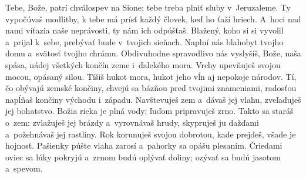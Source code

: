 Tebe, Bože, patrí chválospev na Sione;
tebe treba plniť sľuby v~Jeruzaleme.
\versseparator
Ty vypočúvaš modlitby,
k tebe má prísť každý človek, keď ho ťaží hriech.
\versseparator
A~hoci nad nami víťazia naše neprávosti,
ty nám ich odpúšťaš.
\versseparator
Blažený, koho si si vyvolil a~prijal k~sebe,
prebývať bude v~tvojich sieňach.
\versseparator
Naplní nás blahobyt tvojho domu
a~svätosť tvojho chrámu.
Obdivuhodne spravodlivo nás vyslyšíš,
\versseparator
Bože, naša spása,
nádej všetkých končín zeme i~ďalekého mora.
\versseparator
Vrchy upevňuješ svojou mocou,
opásaný silou.
Tíšiš hukot mora,
hukot jeho vĺn
\versseparator
aj nepokoje národov.
Tí, čo obývajú zemské končiny,
chvejú sa bázňou pred tvojimi znameniami,
radosťou napĺňaš končiny východu i~západu.
\versseparator
Navštevuješ zem a~dávaš jej vlahu,
zveľaďuješ jej bohatstvo.
\versseparator
Božia rieka je plná vody;
ľuďom pripravuješ zrno.
Takto sa staráš o~zem:
zvlažuješ jej brázdy a~vyrovnávaš hrudy,
skypruješ ju dažďami a~požehnávaš jej rastliny.
\versseparator
Rok korunuješ svojou dobrotou,
kade prejdeš, všade je hojnosť.
\versseparator
Pašienky púšte vlaha zarosí
a~pahorky sa opášu plesaním.
\versseparator
Čriedami oviec sa lúky pokryjú
a~zrnom budú oplývať doliny;
ozývať sa budú jasotom a~spevom.